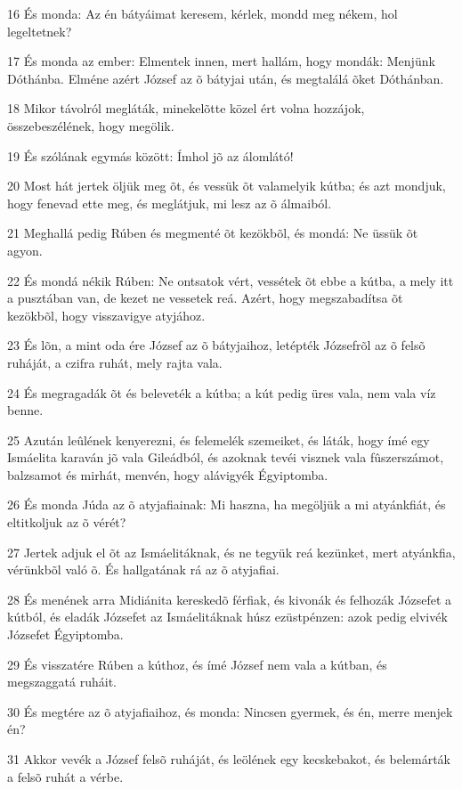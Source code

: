 \par 16 És monda: Az én bátyáimat keresem, kérlek, mondd meg nékem, hol legeltetnek?
\par 17 És monda az ember: Elmentek innen, mert hallám, hogy mondák: Menjünk Dóthánba. Elméne azért József az õ bátyjai után, és megtalálá õket Dóthánban.
\par 18 Mikor távolról megláták, minekelõtte közel ért volna hozzájok, összebeszélének, hogy megölik.
\par 19 És szólának egymás között: Ímhol jõ az álomlátó!
\par 20 Most hát jertek öljük meg õt, és vessük õt valamelyik kútba; és azt mondjuk, hogy fenevad ette meg, és meglátjuk, mi lesz az õ álmaiból.
\par 21 Meghallá pedig Rúben és megmenté õt kezökbõl, és mondá: Ne üssük õt agyon.
\par 22 És mondá nékik Rúben: Ne ontsatok vért, vessétek õt ebbe a kútba, a mely itt a pusztában van, de kezet ne vessetek reá. Azért, hogy megszabadítsa õt kezökbõl, hogy visszavigye atyjához.
\par 23 És lõn, a mint oda ére József az õ bátyjaihoz, letépték Józsefrõl az õ felsõ ruháját, a czifra ruhát, mely rajta vala.
\par 24 És megragadák õt és beleveték a kútba; a kút pedig üres vala, nem vala víz benne.
\par 25 Azután leûlének kenyerezni, és felemelék szemeiket, és láták, hogy ímé egy Ismáelita karaván jõ vala Gileádból, és azoknak tevéi visznek vala fûszerszámot, balzsamot és mirhát, menvén, hogy alávigyék Égyiptomba.
\par 26 És monda Júda az õ atyjafiainak: Mi haszna, ha megöljük a mi atyánkfiát, és eltitkoljuk az õ vérét?
\par 27 Jertek adjuk el õt az Ismáelitáknak, és ne tegyük reá kezünket, mert atyánkfia, vérünkbõl való õ. És hallgatának rá az õ atyjafiai.
\par 28 És menének arra Midiánita kereskedõ férfiak, és kivonák és felhozák Józsefet a kútból, és eladák Józsefet az Ismáelitáknak húsz ezüstpénzen: azok pedig elvivék Józsefet Égyiptomba.
\par 29 És visszatére Rúben a kúthoz, és ímé József nem vala a kútban, és megszaggatá ruháit.
\par 30 És megtére az õ atyjafiaihoz, és monda: Nincsen gyermek, és én, merre menjek én?
\par 31 Akkor vevék a József felsõ ruháját, és leölének egy kecskebakot, és belemárták a felsõ ruhát a vérbe.

